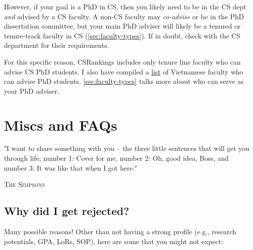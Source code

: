\documentclass[oneside,11pt]{book}
\begin{document}
However, if your goal is a PhD in CS, then you likely need to be in the CS dept \emph{and} advised by a CS faculty. A non-CS faculty may \emph{co-advise} or be in the PhD dissertation committee, but your main PhD adviser will likely be a tenured or tenure-track faculty in CS (\autoref{sec:faculty-types}). If in doubt, check with the CS department for their requirements.

For this specific reason,  CSRankings includes only tenure line faculty who can advise CS PhD students. I also have compiled a \href{https://github.com/dynaroars/dynaroars.github.io/wiki/Viet-CS-Profs-US}{list} of Vietnamese faculty who can advise PhD students. \autoref{sec:faculty-types} talks more about who can serve as your PhD adviser.


\chapter{Miscs and FAQs}
\epigraph{"I want to share something with you – the three little sentences that will get you through life; number 1: Cover for me, number 2: Oh, good idea, Boss, and number 3: It was like that when I got here."}{\textsc{The Simpsons}}

\section{Why did I get rejected?}\label{sec:why-rejected}
Many possible reasons!  Other than not having a strong profile (e.g., research potentials, GPA, LoRs, SOP), here are some that you might not expect:
\end{document}
